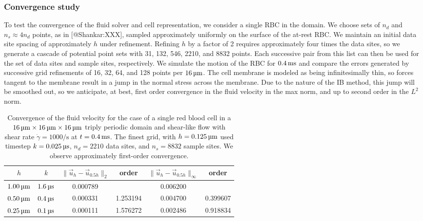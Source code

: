 \subsubsection{Convergence study}
To test the convergence of the fluid solver and cell representation, we
consider a single RBC in the domain. We choose sets of $n_d$ and $n_s\approx
4n_d$ points, as in [@Shankar:XXX], sampled approximately uniformly on the
surface of the at-rest RBC. We maintain an initial data site spacing of
approximately $h$ under refinement. Refining $h$ by a factor of 2 requires
approximately four times the data sites, so we generate a cascade of potential
point sets with 31, 132, 546, 2210, and 8832 points. Each successive pair from
this list can then be used for the set of data sites and sample sites,
respectively. We simulate the motion of the RBC for $0.4\ms$ and compare the
errors generated by successive grid refinements of 16, 32, 64, and 128 points
per $16\um$. The cell membrane is modeled as being infinitesimally thin, so
forces tangent to the membrane result in a jump in the normal stress across the
membrane. Due to the nature of the IB method, this jump will be smoothed out,
so we anticipate, at best, first order convergence in the fluid velocity in the
max norm, and up to second order in the $L^2$ norm.


\begin{table}
    \begin{center}
        \begingroup
        \setlength{\tabcolsep}{9pt}
        \renewcommand{\arraystretch}{1.5}
        \begin{tabular}{cc|cc|cc}
                                                                                                                                    \\ \toprule
            $h$       & $k$      & $\|\vec{u}_h-\vec{u}_{0.5h}\|_2$ & order    & $\|\vec{u}_h-\vec{u}_{0.5h}\|_{\infty}$ & order    \\ \midrule
            $1.00\um$ & $1.6\us$ & 0.000789                         &          & 0.006200                                &          \\
            $0.50\um$ & $0.4\us$ & 0.000331                         & 1.253194 & 0.004700                                & 0.399607 \\
            $0.25\um$ & $0.1\us$ & 0.000111                         & 1.576272 & 0.002486                                & 0.918834 \\ \bottomrule
        \end{tabular}
        \endgroup
    \end{center}
    \caption{%
        Convergence of the fluid velocity for the case of a single red blood
        cell in a $16\um\times16\um\times16\um$ triply periodic domain and
        shear-like flow with shear rate $\dot{\gamma} = 1000\si{\per\second}$
        at $t=0.4\ms$. The finest grid, with $h=0.125\um$ used timestep
        $k=0.025\us$, $n_d=2210$ data sites, and $n_s=8832$ sample sites. We
        observe approximately first-order convergence.
    }
    \label{tab:u-convergence}
\end{table}

